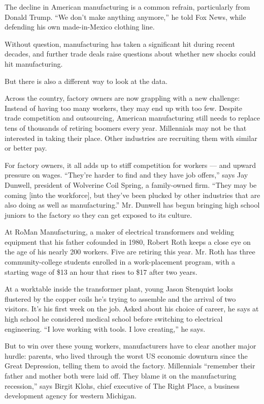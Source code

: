 \documentclass[UTF8,11pt]{ctexart}
\begin{document}
The decline in American manufacturing is a common refrain, particularly from Donald Trump. “We don’t make anything anymore,” he told Fox News, while defending his own made-in-Mexico clothing line.


Without question, manufacturing has taken a significant hit during recent decades, and further trade deals raise questions about whether new shocks could hit manufacturing.


But there is also a different way to look at the data.


Across the country, factory owners are now grappling with a new challenge: Instead of having too many workers, they may end up with too few. Despite trade competition and outsourcing, American manufacturing still needs to replace tens of thousands of retiring boomers every year. Millennials may not be that interested in taking their place. Other industries are recruiting them with similar or better pay.


For factory owners, it all adds up to stiff competition for workers — and upward pressure on wages. “They’re harder to find and they have job offers,” says Jay Dunwell, president of Wolverine Coil Spring, a family-owned firm. “They may be coming [into the workforce], but they’ve been plucked by other industries that are also doing as well as manufacturing.” Mr. Dunwell has begun bringing high school juniors to the factory so they can get exposed to its culture.


At RoMan Manufacturing, a maker of electrical transformers and welding equipment that his father cofounded in 1980, Robert Roth keeps a close eye on the age of his nearly 200 workers. Five are retiring this year. Mr. Roth has three community-college students enrolled in a work-placement program, with a starting wage of \$13 an hour that rises to \$17 after two years.


At a worktable inside the transformer plant, young Jason Stenquist looks flustered by the copper coils he’s trying to assemble and the arrival of two visitors. It’s his first week on the job. Asked about his choice of career, he says at high school he considered medical school before switching to electrical engineering. “I love working with tools. I love creating,” he says.


But to win over these young workers, manufacturers have to clear another major hurdle: parents, who lived through the worst US economic downturn since the Great Depression, telling them to avoid the factory. Millennials “remember their father and mother both were laid off. They blame it on the manufacturing recession,” says Birgit Klohs, chief executive of The Right Place, a business development agency for western Michigan.
\end{document}
